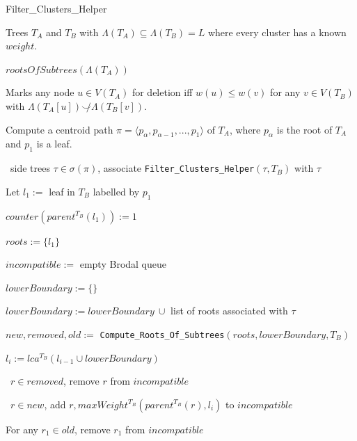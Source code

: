\documentclass{article}
\newcommand{\compatible}{\smile}
\newcommand{\leafset}{\Lambda}
\begin{document}
    \begin{algorithm}[ht]
        \caption{Filter\_Clusters\_Helper}
        \label{alg:filterclustershelper}

        \begin{algorithmic}[1]
            \Input Trees $T_A$ and $T_B$ with $\leafset(T_A) \subseteq \leafset(T_B) = L$ where every cluster has a known $weight$.

            \Output $rootsOfSubtrees(\leafset(T_A))$

            \SideEffect Marks any node $u \in V(T_A)$ for deletion iff $w(u) \leq w(v)$ for any $v \in V(T_B)$ with $\leafset(T_A[u]) \not\compatible \leafset(T_B[v])$.

            \State Compute a centroid path $\pi = \langle p_{\alpha}, p_{\alpha - 1}, ..., p_1 \rangle$ of $T_A$, where $p_{\alpha}$ is the root of $T_A$ and $p_1$ is a leaf.

            \State \algorithmicforall\ side trees $\tau \in \sigma(\pi)$,
                associate \texttt{Filter\_Clusters\_Helper}$(\tau, T_B)$ with $\tau$

            \State Let $l_1 :=$ leaf in $T_B$ labelled by $p_1$

            \State $counter(parent^{T_B}(l_1)) := 1$

            \State $roots := \{l_1\}$

            \State $incompatible :=$ empty Brodal queue

                \State $lowerBoundary := \{\}$

                    \State $lowerBoundary := lowerBoundary\ \cup$ list of roots associated with $\tau$
                \EndFor

                \State $new, removed, old :=$ \texttt{Compute\_Roots\_Of\_Subtrees}$(roots, lowerBoundary, T_B)$

                \State $l_i := lca^{T_B}(l_{i-1} \cup lowerBoundary)$

                \State \algorithmicforall\ $r \in removed$, remove $r$ from $incompatible$
                \label{step:removedrootsremoval}

                \State \algorithmicforall\ $r \in new$, add $r, maxWeight^{T_B}(parent^{T_B}(r), l_i)$ to $incompatible$

                    \State For any $r_1 \in old$, remove $r_1$ from $incompatible$
                    \label{step:oldrootremoval}


\end{algorithmic}
\end{algorithm}
\end{document}
